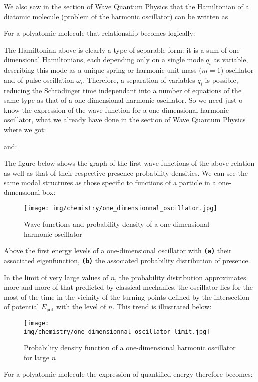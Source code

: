 	We also saw in the section of Wave Quantum Physics that the Hamiltonian of a diatomic molecule (problem of the harmonic oscillator) can be written as
	
	For a polyatomic molecule that relationship becomes logically:
	
	The Hamiltonian above is clearly a type of separable form: it is a sum of one-dimensional Hamiltonians, each depending only on a single mode $q_i$ as variable, describing this mode as a unique spring or harmonic unit mass ($m=1$) oscillator and of pulse oscillation $\omega_i$. Therefore, a separation of variables $q_i$ is possible, reducing the Schrödinger time independant into a number of equations of the same type as that of a one-dimensional harmonic oscillator. So we need just o know the expression of the wave function for a one-dimensional harmonic oscillator, what we already have done in the section of Wave Quantum Physics where we got:
	
	and:
	
	The figure below shows the graph of the first wave functions of the above relation as well as that of their respective presence probability densities. We can see the same modal structures as those specific to functions of a particle in a one-dimensional box:
	\begin{figure}[H]
		\begin{center}
		\texttt{[image: img/chemistry/one\_dimensionnal\_oscillator.jpg]}
		\end{center}	
		\caption{Wave functions and probability density of a one-dimensional harmonic oscillator}
	\end{figure}
	Above the first energy levels of a one-dimensional oscillator with \texttt{\textbf{(a)}} their associated eigenfunction, \texttt{\textbf{(b)}} the  associated probability distribution of presence.
	
	In the limit of very large values of $n$, the probability distribution approximates more and more of that predicted by classical mechanics, the oscillator lies for the most of the time in the vicinity of the turning points defined by the intersection of potential $E_{\text{pot}}$ with the level of $n$. This trend is illustrated below:
	\begin{figure}[H]
		\begin{center}
		\texttt{[image: img/chemistry/one\_dimensionnal\_oscillator\_limit.jpg]}
		\end{center}	
		\caption{Probability density function of a one-dimensional harmonic oscillator for large $n$}
	\end{figure}
	For a polyatomic molecule the expression of quantified energy therefore becomes:
	
